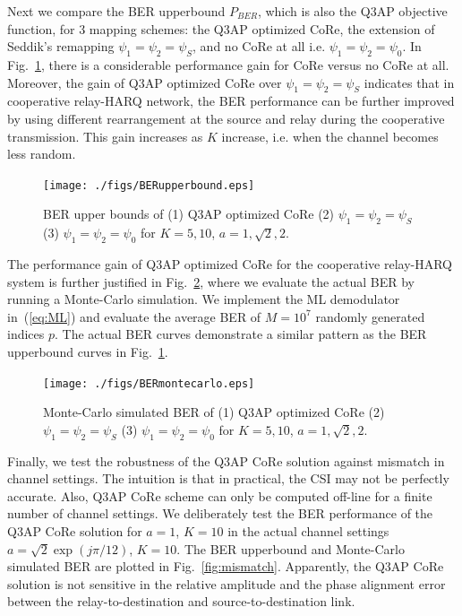 \documentclass[conference]{IEEEtran}
\begin{document}
Next we compare the BER upperbound $P_{BER}$, which is also the Q3AP objective
function, for 3 mapping schemes: the Q3AP optimized CoRe, the extension of
Seddik's remapping $\psi_1 = \psi_2 = \psi_S$, and no CoRe at all i.e. $\psi_1 =
\psi_2 = \psi_0$. In Fig.~\ref{fig:BERupperbound}, there is a considerable
performance gain for CoRe versus no CoRe at all. Moreover, the gain of Q3AP
optimized CoRe over $\psi_1 = \psi_2 = \psi_S$ indicates that in cooperative
relay-HARQ network, the BER performance can be further improved by using
different rearrangement at the source and relay during the cooperative
transmission. This gain increases as $K$ increase, i.e. when the channel becomes
less random.

\begin{figure}[!t]
    \centering
    \texttt{[image: ./figs/BERupperbound.eps]}
    \caption{BER upper bounds of (1) Q3AP optimized CoRe (2) $\psi_1 = \psi_2 =
    \psi_S$ (3) $\psi_1 = \psi_2 = \psi_0$ for $K = 5, 10$, $a = 1, \sqrt{2},
    2$.}
    \label{fig:BERupperbound}
\end{figure}

The performance gain of Q3AP optimized CoRe for the cooperative relay-HARQ
system is further justified in Fig.~\ref{fig:montecarlo}, where we evaluate the
actual BER by running a Monte-Carlo simulation. We implement the ML demodulator
in~(\ref{eq:ML}) and evaluate the average BER of $M=10^7$ randomly generated
indices $p$. The actual BER curves demonstrate a similar pattern as the BER
upperbound curves in Fig.~\ref{fig:BERupperbound}.

\begin{figure}[!t]
    \centering
    \texttt{[image: ./figs/BERmontecarlo.eps]}
    \caption{Monte-Carlo simulated BER of (1) Q3AP optimized CoRe
    (2) $\psi_1 = \psi_2 = \psi_S$ (3) $\psi_1 = \psi_2 = \psi_0$ for $K = 5,
    10$, $a = 1, \sqrt{2}, 2$.}
    \label{fig:montecarlo}
\end{figure}

Finally, we test the robustness of the Q3AP CoRe solution against mismatch in
channel settings. The intuition is that in practical, the CSI may not be
perfectly accurate. Also, Q3AP CoRe scheme can only be computed off-line for a
finite number of channel settings. We deliberately test the BER performance of
the Q3AP CoRe solution for $a=1$, $K=10$ in the actual channel settings $a =
\sqrt{2}\exp(j\pi/12)$, $K = 10$. The BER upperbound and Monte-Carlo simulated
BER are plotted in Fig.~\ref{fig:mismatch}. Apparently, the Q3AP CoRe solution
is not sensitive in the relative amplitude and the phase alignment error between
the relay-to-destination and source-to-destination link.
\end{document}

